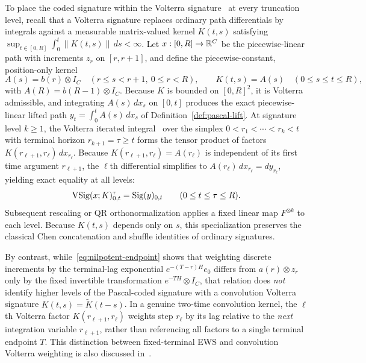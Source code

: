 To place the coded signature within the Volterra signature~\cite{volterra} at
every truncation level, recall that a Volterra signature replaces ordinary path
differentials by integrals against a measurable matrix-valued kernel \(K(t, s)\)
satisfying \(\sup_{t \in [0, R]} \int_0^t \|K(t, s)\|\,ds < \infty\). Let
\(x:[0, R]\to\mathbb{R}^C\) be the piecewise-linear path with increments \(z_r\) on
\([r, r+1]\), and define the piecewise-constant, position-only kernel
\[
 A(s) = b(r) \otimes I_C \quad (r \leq s < r + 1,\ 0 \leq r < R), \qquad
 K(t, s) = A(s) \quad (0 \leq s \leq t \leq R),
\]
with \(A(R) = b(R-1) \otimes I_C\). Because \(K\) is bounded on \([0, R]^2\), it
is Volterra admissible, and integrating \(A(s)\,dx_s\) on \([0, t]\) produces the
exact piecewise-linear lifted path \(y_t = \int_0^t A(s)\,dx_s\) of
Definition~\ref{def:pascal-lift}. At signature level \(k \geq 1\), the Volterra
iterated integral~\cite[Def.~2.14]{volterra} over the simplex
\(0 < r_1 < \cdots < r_k < t\) with terminal horizon \(r_{k+1} = \tau \geq t\)
forms the tensor product of factors \(K(r_{\ell+1}, r_\ell)\,dx_{r_\ell}\).
Because \(K(r_{\ell+1}, r_\ell) = A(r_\ell)\) is independent of its first time
argument \(r_{\ell+1}\), the \(\ell\)th differential simplifies to
\(A(r_\ell)\,dx_{r_\ell} = dy_{r_\ell}\), yielding exact equality at all levels:
\[
 \operatorname{VSig}(x; K)^{\tau}_{0, t} = \operatorname{Sig}(y)_{0, t} \qquad (0 \leq t \leq \tau \leq R).
\]
Subsequent rescaling or QR orthonormalization applies a fixed linear map
\(F^{\otimes k}\) to each level. Because \(K(t, s)\) depends only on \(s\), this
specialization preserves the classical Chen concatenation and shuffle identities
of ordinary signatures.

By contrast, while~\eqref{eq:nilpotent-endpoint} shows that weighting discrete
increments by the terminal-lag exponential \(e^{-(T-r)H} e_0\) differs from
\(a(r) \otimes z_r\) only by the fixed invertible transformation
\(e^{-TH} \otimes I_C\), that relation does \emph{not} identify higher levels of
the Pascal-coded signature with a convolution Volterra signature
\(K(t, s) = \widetilde K(t - s)\). In a genuine two-time convolution kernel, the
\(\ell\)th Volterra factor \(K(r_{\ell+1}, r_\ell)\) weights step \(r_\ell\) by
its lag relative to the \emph{next} integration variable \(r_{\ell+1}\), rather
than referencing all factors to a single terminal endpoint \(T\). This distinction
between fixed-terminal EWS and convolution Volterra weighting is also discussed
in~\cite[App.~D.2]{ews}.
